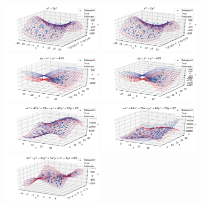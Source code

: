 \documentclass[12pt]{article}
\begin{document}
        \begin{figure}[H]
            \includegraphics[width=0.45\textwidth]{f_5_noise3_estplot_ard}
            \includegraphics[width=0.45\textwidth]{f_5_noise3_estplot_regular}
            \includegraphics[width=0.45\textwidth]{f_6_noise3_estplot_ard}
            \includegraphics[width=0.45\textwidth]{f_6_noise3_estplot_regular}
            \includegraphics[width=0.45\textwidth]{f_7_noise3_estplot_ard}
            \includegraphics[width=0.45\textwidth]{f_7_noise3_estplot_regular}
            \includegraphics[width=0.45\textwidth]{f_8_noise3_estplot_ard}

\end{figure}
\end{document}
